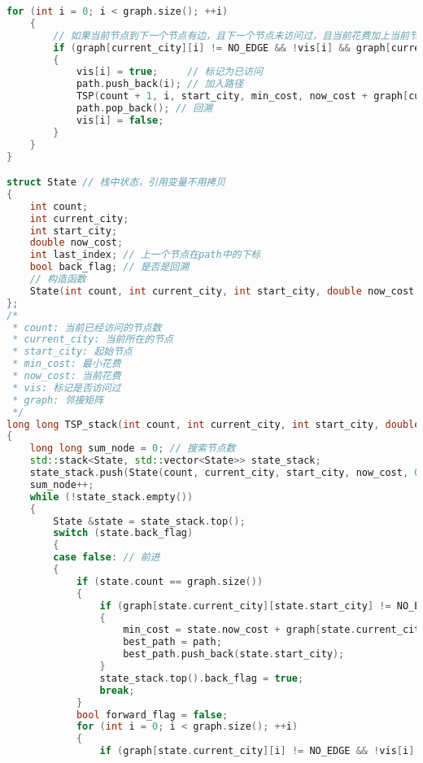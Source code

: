 \documentclass[lang=cn,11pt,a4paper]{elegantpaper}
\begin{document}
\begin{lstlisting}[language=c++]
    for (int i = 0; i < graph.size(); ++i)
    {
        // 如果当前节点到下一个节点有边，且下一个节点未访问过，且当前花费加上当前节点到下一个节点的花费小于最小花费
        if (graph[current_city][i] != NO_EDGE && !vis[i] && graph[current_city][i] + now_cost < min_cost)
        {
            vis[i] = true;     // 标记为已访问
            path.push_back(i); // 加入路径
            TSP(count + 1, i, start_city, min_cost, now_cost + graph[current_city][i], best_path, path, vis, graph, sum_node);
            path.pop_back(); // 回溯
            vis[i] = false;
        }
    }
}

struct State // 栈中状态，引用变量不用拷贝
{
    int count;
    int current_city;
    int start_city;
    double now_cost;
    int last_index; // 上一个节点在path中的下标
    bool back_flag; // 是否是回溯
    // 构造函数
    State(int count, int current_city, int start_city, double now_cost, int last_index, bool back_flag) : count(count), current_city(current_city), start_city(start_city), now_cost(now_cost), last_index(last_index), back_flag(back_flag) {}
};
/*
 * count: 当前已经访问的节点数
 * current_city: 当前所在的节点
 * start_city: 起始节点
 * min_cost: 最小花费
 * now_cost: 当前花费
 * vis: 标记是否访问过
 * graph: 邻接矩阵
 */
long long TSP_stack(int count, int current_city, int start_city, double &min_cost, double now_cost, std::vector<int> &best_path, std::vector<int> &path, std::vector<bool> &vis, std::vector<std::vector<double>> &graph)
{
    long long sum_node = 0; // 搜索节点数
    std::stack<State, std::vector<State>> state_stack;
    state_stack.push(State(count, current_city, start_city, now_cost, 0, false));
    sum_node++;
    while (!state_stack.empty())
    {
        State &state = state_stack.top();
        switch (state.back_flag)
        {
        case false: // 前进
        {
            if (state.count == graph.size())
            {
                if (graph[state.current_city][state.start_city] != NO_EDGE && state.now_cost + graph[state.current_city][state.start_city] < min_cost)
                {
                    min_cost = state.now_cost + graph[state.current_city][state.start_city];
                    best_path = path;
                    best_path.push_back(state.start_city);
                }
                state_stack.top().back_flag = true;
                break;
            }
            bool forward_flag = false;
            for (int i = 0; i < graph.size(); ++i)
            {
                if (graph[state.current_city][i] != NO_EDGE && !vis[i] && graph[state.current_city][i] + state.now_cost < min_cost)

\end{lstlisting}
\end{document}
